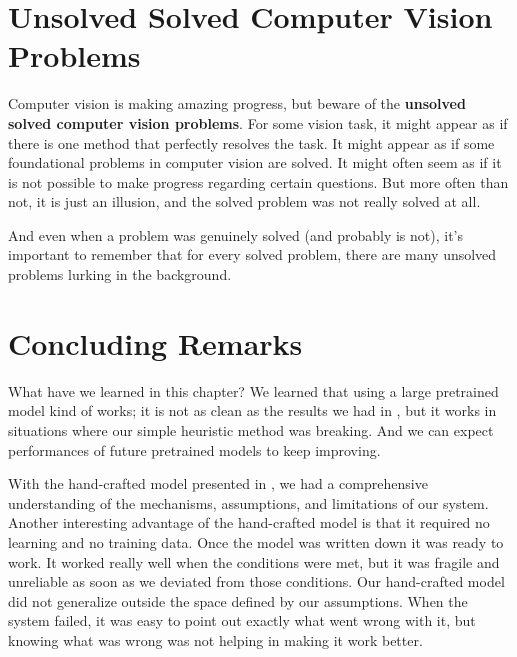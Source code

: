 \section{Unsolved Solved Computer Vision Problems}

Computer vision is making amazing progress, but beware of the {\bf unsolved solved computer vision problems}. For some vision task, it might appear as if there is one method that perfectly resolves the task. It might appear as if some foundational problems in computer vision are solved. It might often seem as if it is not possible to make progress regarding certain questions. But more often than not, it is just an illusion, and the solved problem was not really solved at all. 

And even when a problem was genuinely solved (and probably is not), it's important to remember that for every solved problem, there are many unsolved problems lurking in the background.


\section{Concluding Remarks}

What have we learned in this chapter? We learned that using a large pretrained model kind of works; it is not as clean as the results we had in \chap{\ref{chapter:simplesystem}}, but it works in situations where our simple heuristic method was breaking. And we can expect performances of future pretrained models to keep improving. 

With the hand-crafted model presented in \chap{\ref{chapter:simplesystem}}, we had a comprehensive understanding of the mechanisms, assumptions, and limitations of our system. Another interesting advantage of the hand-crafted model is that it required no learning and no training data. Once the model was written down it was ready to work. It worked really well when the conditions were met, but it was fragile and unreliable as soon as we deviated from those conditions. Our hand-crafted model did not generalize outside the space defined by our assumptions. When the system failed, it was easy to point out exactly what went wrong with it, but knowing what was wrong was not helping in making it work better. 

